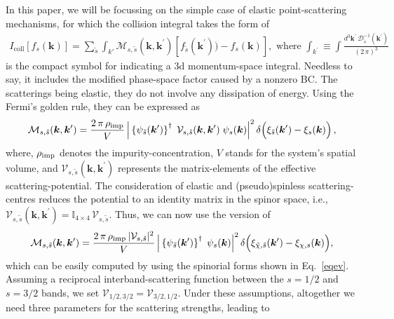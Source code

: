 \documentclass[aps,prb,onecolumn,nofootinbib,citeautoscript,10pt, showkeys]{revtex4-2}
\begin{document}
In this paper, we will be focussing on the simple case of elastic point-scattering mechanisms, for which the collision integral takes the form of
\begin{align}
I_{\text{coll}} [f_s({\boldsymbol k})]
 = \sum \limits_{\tilde s}
\int_{k'}
\mathcal{M}_{ s, \tilde s} (\boldsymbol k,\boldsymbol k^\prime)
\left[ f_{\tilde s} ( \boldsymbol k^\prime))  - f_s (\boldsymbol k) \right ] ,
\text{ where  }
\int_{k^\prime} \equiv \int  \frac{ d^3 \boldsymbol k^\prime \, \mathcal{D}^{-1}_{\tilde s} ({\boldsymbol k}^\prime) } 
{ (2\,\pi)^3 }
\end{align}
is the compact symbol for indicating a 3d momentum-space integral. Needless to say, it includes the modified phase-space factor caused by a nonzero BC. The scatterings being elastic, they do not involve any dissipation of energy. Using the Fermi's golden rule, they can be expressed as
\begin{align}
\label{eqMimp}
\mathcal{M}_{ s, \tilde s} (\boldsymbol k,\boldsymbol k^\prime) 
= \frac{2\, \pi \, \rho_{\rm imp} } {V} \,
\Big \vert \left \lbrace  \psi_{\tilde s }({ \boldsymbol k^\prime }) 
\right \rbrace^\dagger 
\; {\mathcal V} _{ s, \tilde s} (\boldsymbol k,\boldsymbol k^\prime) 
  \;  \psi_s ({ \boldsymbol k}) \Big \vert^2 \,
 \delta \Big( \xi_{\tilde s } (\boldsymbol k^\prime)- \xi_s (\boldsymbol k ) \Big) \,,
\end{align}
where, $ \rho_{\rm imp}$ denotes the impurity-concentration, $V$ stands for the system's spatial volume, and ${\mathcal V} _{ s, \tilde s} (\boldsymbol k,\boldsymbol k^\prime) $ represents the matrix-elements of the effective scattering-potential. The consideration of elastic and (pseudo)spinless scattering-centres reduces the potential to an identity matrix in the spinor space, i.e., $ {\mathcal V} _{ s, \tilde s} (\boldsymbol k,\boldsymbol k^\prime) 
=  \mathbb{I}_{4 \times 4} \, {\mathcal V} _{ s, \tilde s} $. Thus, we can now use the version of
\begin{align}
\label{eqMimp1}
\mathcal{M}_{ s, \tilde s} (\boldsymbol k,\boldsymbol k^\prime) 
= \frac{2\, \pi \, \rho_{\rm imp} 
\, |{\mathcal V} _{ s, \tilde s} |^2} 
{V} \,
\Big \vert \left \lbrace  \psi_{\tilde s }({ \boldsymbol k^\prime }) \right \rbrace^\dagger 
\; \psi_{s}({ \boldsymbol k}) \Big \vert^2 \,
 \delta \Big( \xi_{\tilde \chi , \tilde s } (\boldsymbol k^\prime)
 - \xi_{  \chi , s } (\boldsymbol k ) \Big) ,
\end{align}
which can be easily computed by using the spinorial forms shown in Eq.~\eqref{eqev}. Assuming a reciprocal interband-scattering function between the $ s = 1/2$ and $s=3/2$ bands, we set $ {\mathcal V}_{ 1/2, 3/2 } = {\mathcal V}_{ 3/2, 1/2 }$. Under these assumptions, altogether we need three parameters for the scattering strengths, leading to
\end{document}
